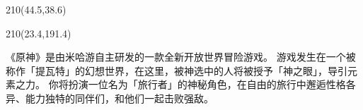 \cleardoublepage %


\begin{textblock}{210}(44.5,38.6)
    \bfseries
    \makebox[28em][l]{\stutitle}
\end{textblock}

\begin{textblock}{210}(23.4,191.4)
    \bfseries
\end{textblock}

\begin{requirementtext}
    \par 《原神》是由米哈游自主研发的一款全新开放世界冒险游戏。
    游戏发生在一个被称作「提瓦特」的幻想世界，在这里，被神选中的人将被授予「神之眼」，导引元素之力。
    你将扮演一位名为「旅行者」的神秘角色，在自由的旅行中邂逅性格各异、能力独特的同伴们，和他们一起击败强敌。
\end{requirementtext}

\null\clearpage